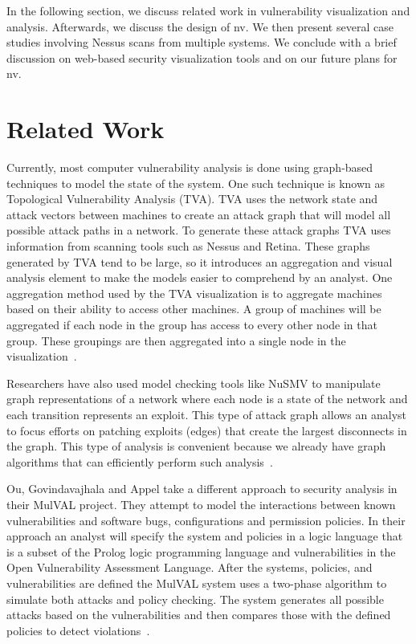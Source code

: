 \documentclass{acm_proc_article-sp}
\begin{document}
In the following section, we discuss related work in vulnerability visualization and analysis. Afterwards, we discuss the design of nv. We then present several case studies involving Nessus scans from multiple systems. We conclude with a brief discussion on web-based security visualization tools and on our future plans for nv.

\section{Related Work}

Currently, most computer vulnerability analysis is done using graph-based
techniques to model the state of the system. One such technique is known as
Topological Vulnerability Analysis (TVA). TVA uses the network state and attack
vectors between machines to create an attack graph that will model all possible attack paths in a
network. To generate these attack graphs TVA uses information from scanning
tools such as Nessus and Retina. These graphs generated by TVA tend to be 
large, so it introduces an aggregation and visual analysis element to make the
models easier to comprehend by an analyst. One aggregation method used by the TVA
visualization is to aggregate machines based on their ability to access other machines. A group of
machines will be aggregated if each node in the group has access to every other
node in that group.
These groupings are then aggregated into a single node in the visualization~\cite{Noel:2009bu}.

Researchers have also used model checking tools like NuSMV to manipulate graph
representations of a network where each node is a state of the network and each
transition represents an exploit.  This type of attack graph allows an analyst
to focus efforts on patching exploits (edges) that create the largest
disconnects in the graph. This type of analysis is convenient because we
already have graph algorithms that can efficiently perform such analysis~\cite{Ammann:2002ty}.

Ou, Govindavajhala and Appel take a different approach to security analysis in
their MulVAL project.
They attempt to model the interactions between known vulnerabilities and
software bugs, configurations and permission policies.  In their approach an
analyst will specify the system and policies in a logic language that is a subset of the
Prolog logic programming language and vulnerabilities in the Open Vulnerability
Assessment Language. After the systems, policies, and vulnerabilities are defined
the MulVAL system uses a two-phase algorithm to simulate both attacks and policy
checking. The system generates all possible attacks based on the
vulnerabilities and then compares those with the defined policies to detect
violations~\cite{Ou:2005:MLN:1251398.1251406}.
\end{document}
